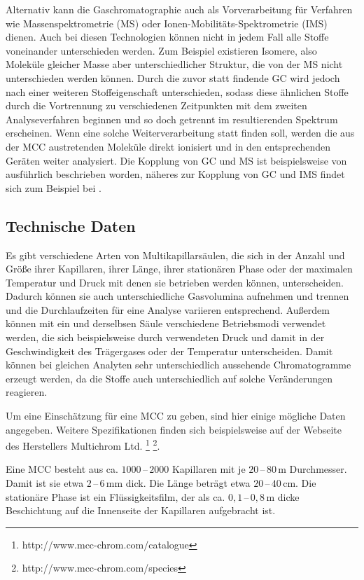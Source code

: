 Alternativ kann die Gaschromatographie auch als Vorverarbeitung für Verfahren wie Massenspektrometrie (MS) oder Ionen-Mobilitäts-Spektrometrie (IMS) dienen. Auch bei diesen Technologien können nicht in jedem Fall alle Stoffe voneinander unterschieden werden. Zum Beispiel existieren Isomere, also Moleküle gleicher Masse aber unterschiedlicher Struktur, die von der MS nicht unterschieden werden können. Durch die zuvor statt findende GC wird jedoch nach einer weiteren Stoffeigenschaft unterschieden, sodass diese ähnlichen Stoffe durch die Vortrennung zu verschiedenen Zeitpunkten mit dem zweiten Analyseverfahren beginnen und so doch getrennt im resultierenden Spektrum erscheinen. Wenn eine solche Weiterverarbeitung statt finden soll, werden die aus der MCC austretenden Moleküle direkt ionisiert und in den entsprechenden Geräten weiter analysiert.
Die Kopplung von GC und MS ist beispielsweise von \cite{Hubschmann2009} ausführlich beschrieben worden, näheres zur Kopplung von GC und IMS findet sich zum Beispiel bei \cite {Baumbach2009}. 


\subsection{Technische Daten}

Es gibt verschiedene Arten von Multikapillarsäulen, die sich in der Anzahl und Größe ihrer Kapillaren, ihrer Länge, ihrer stationären Phase oder der maximalen Temperatur und Druck mit denen sie betrieben werden können, unterscheiden. Dadurch können sie auch unterschiedliche Gasvolumina aufnehmen und trennen und die Durchlaufzeiten für eine Analyse variieren entsprechend. Außerdem können mit ein und derselbsen Säule verschiedene Betriebsmodi verwendet werden, die sich beispielsweise durch verwendeten Druck und damit in der Geschwindigkeit des Trägergases oder der Temperatur unterscheiden. Damit können bei gleichen Analyten sehr unterschiedlich aussehende Chromatogramme erzeugt werden, da die Stoffe auch unterschiedlich auf solche Veränderungen reagieren.

Um eine Einschätzung für eine MCC zu geben, sind hier einige mögliche Daten angegeben. Weitere Spezifikationen finden sich beispielsweise auf der Webseite des Herstellers Multichrom Ltd. \footnote[1]{http://www.mcc-chrom.com/catalogue} \footnote[2]{http://www.mcc-chrom.com/species}.


Eine MCC besteht aus ca. $1000\,$--$\,2000$ Kapillaren mit je $20\,$--$\,80$\,\textmu m Durchmesser. Damit ist sie etwa $2\,$--$\,6$\,mm dick. Die Länge beträgt etwa  $20\,$--$\,40 $\,cm. Die stationäre Phase ist ein Flüssigkeitsfilm, der als ca. $0,1\,$--$\,0,8$\,\textmu m dicke Beschichtung auf die Innenseite der Kapillaren aufgebracht ist. 

